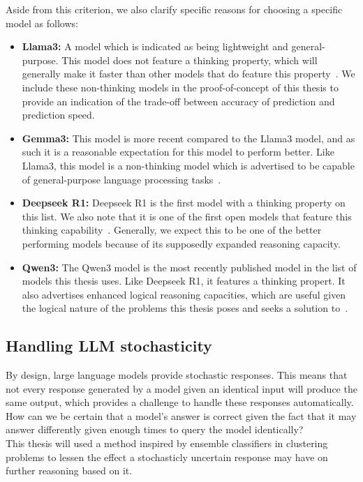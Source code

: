 Aside from this criterion, we also clarify specific reasons for choosing a specific model as follows:
\begin{itemize}
	\item \textbf{Llama3:} A model which is indicated as being lightweight and general-purpose. This model does not feature a thinking property, which will generally make it faster than other models that do feature this property~\cite{ollama_llama3}. We include these non-thinking models in the proof-of-concept of this thesis to provide an indication of the trade-off between accuracy of prediction and prediction speed.
	\item \textbf{Gemma3:} This model is more recent compared to the Llama3 model, and as such it is a reasonable expectation for this model to perform better. Like Llama3, this model is a non-thinking model which is advertised to be capable of general-purpose language processing tasks~\cite{ollama_gemma3}.
	\item \textbf{Deepseek R1:} Deepseek R1 is the first model with a thinking property on this list. We also note that it is one of the first open models that feature this thinking capability~\cite{ollama_deepseekr1}. Generally, we expect this to be one of the better performing models because of its supposedly expanded reasoning capacity.
	\item \textbf{Qwen3:} The Qwen3 model is the most recently published model in the list of models this thesis uses. Like Deepseek R1, it features a thinking propert. It also advertises enhanced logical reasoning capacities, which are useful given the logical nature of the problems this thesis poses and seeks a solution to~\cite{ollama_qwen3}.
\end{itemize}

\subsection{Handling LLM stochasticity}

By design, large language models provide stochastic responses. This means that not every response generated by a model given an identical input will produce the same output, which provides a challenge to handle these responses automatically. How can we be certain that a model's answer is correct given the fact that it may answer differently given enough times to query the model identically? \\

This thesis will used a method inspired by ensemble classifiers in clustering problems to lessen the effect a stochasticly uncertain response may have on further reasoning based on it.

